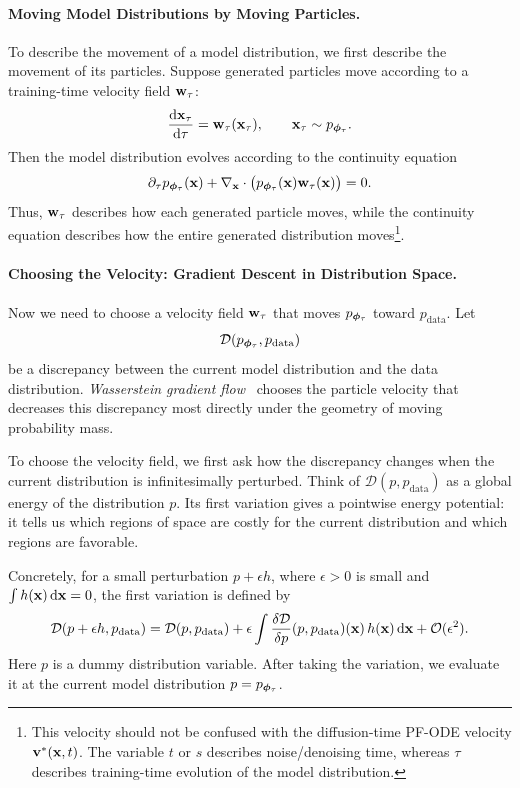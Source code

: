 \paragraph{Moving Model Distributions by Moving Particles.}
To describe the movement of a model distribution, we first describe the movement of
its particles.  Suppose generated particles move according to a training-time
velocity field ${\mathbf{w}}_\tau$:
\[
    \frac{\mathop{}\!\mathrm{d} {\mathbf{x}}_\tau}{\mathop{}\!\mathrm{d} \tau}
    =
    {\mathbf{w}}_\tau({\mathbf{x}}_\tau),
    \qquad
    {\mathbf{x}}_\tau\sim p_{{\bm{\phi}}_\tau}.
\]
Then the model distribution evolves according to the continuity equation
\[
    \partial_\tau p_{{\bm{\phi}}_\tau}({\mathbf{x}})
    +
    \nabla_{{\mathbf{x}}}\cdot
    \big(
        p_{{\bm{\phi}}_\tau}({\mathbf{x}}){\mathbf{w}}_\tau({\mathbf{x}})
    \big)
    =
    0.
\]
Thus, ${\mathbf{w}}_\tau$ describes how each generated particle moves, while the
continuity equation describes how the entire generated distribution moves\footnote{This velocity should not be confused with the diffusion-time PF-ODE velocity
${\mathbf{v}}^*({\mathbf{x}},t)$.  The variable $t$ or $s$ describes noise/denoising time,
whereas $\tau$ describes training-time evolution of the model distribution.}.



\paragraph{Choosing the Velocity: Gradient Descent in Distribution Space.}
Now we need to choose a velocity field ${\mathbf{w}}_\tau$ that moves
$p_{{\bm{\phi}}_\tau}$ toward $p_{\mathrm{data}}$.  Let
\[
    \mathcal{D}(p_{{\bm{\phi}}_\tau},p_{\mathrm{data}})
\]
be a discrepancy between the current model distribution and the data
distribution.  \emph{Wasserstein gradient flow}~\citep{jordan1998variational,ambrosio2005gradient} chooses the particle velocity that
decreases this discrepancy most directly under the geometry of moving
probability mass.

To choose the velocity field, we first ask how the discrepancy changes when the
current distribution is infinitesimally perturbed.  Think of
$\mathcal{D}(p,p_{\mathrm{data}})$ as a global energy of the distribution
$p$.  Its first variation gives a pointwise energy potential: it tells us
which regions of space are costly for the current distribution and which regions
are favorable.

Concretely, for a small perturbation $p+\epsilon h$, where
$\epsilon>0$ is small and $\int h({\mathbf{x}})\mathop{}\!\mathrm{d}{\mathbf{x}}=0$, the first variation is
defined by
\[
    \mathcal{D}(p+\epsilon h,p_{\mathrm{data}})
    =
    \mathcal{D}(p,p_{\mathrm{data}})
    +
    \epsilon
    \int
    \frac{\delta\mathcal{D}}{\delta p}
    (p,p_{\mathrm{data}})({\mathbf{x}})\,
    h({\mathbf{x}})\mathop{}\!\mathrm{d}{\mathbf{x}}
    +
    \mathcal{O}(\epsilon^2).
\]
Here $p$ is a dummy distribution variable.  After taking the variation, we
evaluate it at the current model distribution $p=p_{{\bm{\phi}}_\tau}$.

